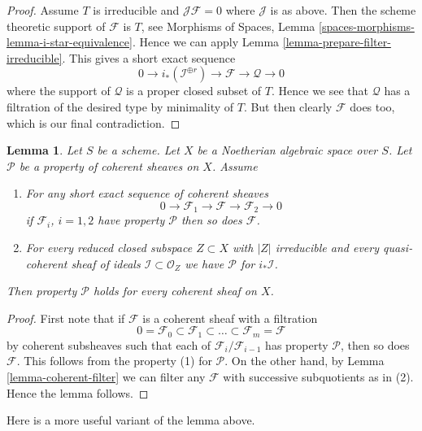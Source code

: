 \documentclass{stacks-project}
\theoremstyle{plain}
\newtheorem{lemma}[subsection]{Lemma}
\theoremstyle{definition}
\theoremstyle{remark}
\numberwithin{equation}{subsection}
\begin{document}
\begin{proof}
\medskip\noindent
Assume $T$ is irreducible and $\mathcal{J}\mathcal{F} = 0$ where
$\mathcal{J}$ is as above. Then the scheme theoretic support of
$\mathcal{F}$ is $T$, see
Morphisms of Spaces, Lemma \ref{spaces-morphisms-lemma-i-star-equivalence}.
Hence we can apply Lemma \ref{lemma-prepare-filter-irreducible}.
This gives a short exact sequence
$$
0 \to
i_*(\mathcal{I}^{\oplus r}) \to
\mathcal{F} \to
\mathcal{Q} \to 0
$$
where the support of $\mathcal{Q}$ is a proper closed subset of $T$.
Hence we see that $\mathcal{Q}$ has a filtration of the desired type
by minimality of $T$. But then clearly $\mathcal{F}$ does too, which is
our final contradiction.
\end{proof}

\begin{lemma}
\label{lemma-property-initial}
Let $S$ be a scheme. Let $X$ be a Noetherian algebraic space over $S$.
Let $\mathcal{P}$ be a property of coherent sheaves on $X$. Assume
\begin{enumerate}
\item For any short exact sequence of coherent sheaves
$$
0 \to \mathcal{F}_1 \to \mathcal{F} \to \mathcal{F}_2 \to 0
$$
if $\mathcal{F}_i$, $i = 1, 2$ have property $\mathcal{P}$
then so does $\mathcal{F}$.
\item For every reduced closed subspace $Z \subset X$ with $|Z|$ irreducible
and every quasi-coherent sheaf of ideals $\mathcal{I} \subset \mathcal{O}_Z$
we have $\mathcal{P}$ for $i_*\mathcal{I}$.
\end{enumerate}
Then property $\mathcal{P}$ holds for every coherent sheaf on $X$.
\end{lemma}

\begin{proof}
First note that if $\mathcal{F}$ is a coherent sheaf with a filtration
$$
0 = \mathcal{F}_0 \subset \mathcal{F}_1 \subset
\ldots \subset \mathcal{F}_m = \mathcal{F}
$$
by coherent subsheaves such that each of $\mathcal{F}_i/\mathcal{F}_{i - 1}$
has property $\mathcal{P}$, then so does $\mathcal{F}$.
This follows from the property (1) for $\mathcal{P}$.
On the other hand, by Lemma \ref{lemma-coherent-filter}
we can filter any $\mathcal{F}$
with successive subquotients as in (2).
Hence the lemma follows.
\end{proof}

\noindent
Here is a more useful variant of the lemma above.
\end{document}
